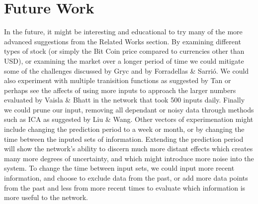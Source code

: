 \documentclass[a4paper,11pt]{article}
\begin{document}
\section{Future Work}

In the future, it might be interesting and educational to try many of the more advanced suggestions from the Related Works section. By examining different types of stock (or simply the Bit Coin price compared to currencies other than USD), or examining the market over a longer period of time we could mitigate some of the challenges discussed by Gryc and  by Forradellas \& Sarrió. We could also experiment with multiple tranisition functions as suggested by Tan or perhaps see the affects of using more inputs to approach the larger numbers evaluated by Vaisla \& Bhatt in the network that took 500 inputs daily. Finally we could prune our input, removing all dependant or noisy data through methods such as ICA as suggested by Liu \& Wang. Other vectors of experimenation might include changing the prediction period to a week or month, or by changing the time between the inputed sets of information. Extending the prediction period will show the network's ability to discern much more distant effects which creates 
many more degrees of uncertainty, and which might introduce more noise into the 
system. To change the time between input sets, we could input more recent information, and choose to exclude data from the past, or add more data points from the past and less from more recent times to evaluate which information is more useful to the network.
\end{document}
